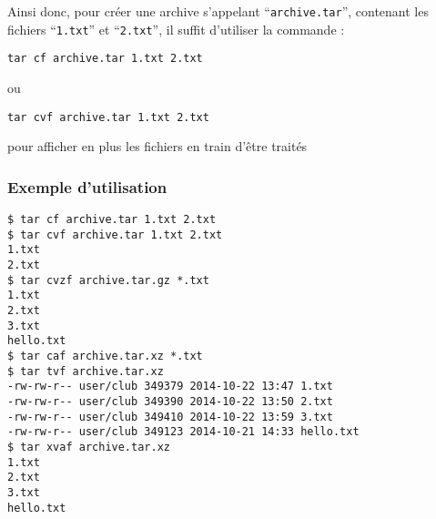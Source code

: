 Ainsi donc, pour créer une archive s'appelant ``\texttt{archive.tar}'',
contenant les fichiers ``\texttt{1.txt}'' et ``\texttt{2.txt}'', il suffit
d'utiliser la commande :

\begin{lstlisting}
tar cf archive.tar 1.txt 2.txt
\end{lstlisting}

ou 
\begin{lstlisting}
tar cvf archive.tar 1.txt 2.txt
\end{lstlisting}

pour afficher en plus les fichiers en train d'être traités

\subsubsection*{Exemple d'utilisation}

\begin{lstlisting}
$ tar cf archive.tar 1.txt 2.txt
$ tar cvf archive.tar 1.txt 2.txt
1.txt
2.txt
$ tar cvzf archive.tar.gz *.txt
1.txt
2.txt
3.txt
hello.txt
$ tar caf archive.tar.xz *.txt
$ tar tvf archive.tar.xz
-rw-rw-r-- user/club 349379 2014-10-22 13:47 1.txt
-rw-rw-r-- user/club 349390 2014-10-22 13:50 2.txt
-rw-rw-r-- user/club 349410 2014-10-22 13:59 3.txt
-rw-rw-r-- user/club 349123 2014-10-21 14:33 hello.txt
$ tar xvaf archive.tar.xz
1.txt
2.txt
3.txt
hello.txt
\end{lstlisting}
